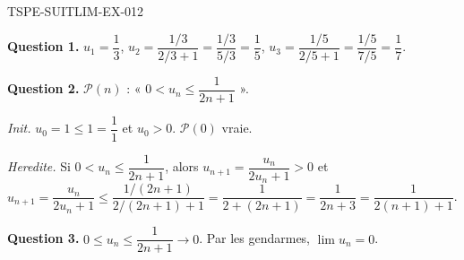 \begin{corrige}{TSPE-SUITLIM-EX-012}

\textbf{Question 1.} $u_1 = \dfrac{1}{3}$, $u_2 = \dfrac{1/3}{2/3+1} = \dfrac{1/3}{5/3} = \dfrac{1}{5}$, $u_3 = \dfrac{1/5}{2/5+1} = \dfrac{1/5}{7/5} = \dfrac{1}{7}$.

\textbf{Question 2.} $\mathcal{P}(n)$ : « $0 < u_n \leq \dfrac{1}{2n+1}$ ».

\textit{Init.} $u_0 = 1 \leq 1 = \dfrac{1}{1}$ et $u_0 > 0$. $\mathcal{P}(0)$ vraie.

\textit{Heredite.} Si $0 < u_n \leq \dfrac{1}{2n+1}$, alors $u_{n+1} = \dfrac{u_n}{2u_n+1} > 0$ et $u_{n+1} = \dfrac{u_n}{2u_n+1} \leq \dfrac{1/(2n+1)}{2/(2n+1)+1} = \dfrac{1}{2+(2n+1)} = \dfrac{1}{2n+3} = \dfrac{1}{2(n+1)+1}$.

\textbf{Question 3.} $0 \leq u_n \leq \dfrac{1}{2n+1} \to 0$. Par les gendarmes, $\boxed{\lim u_n = 0}$.

\end{corrige}
